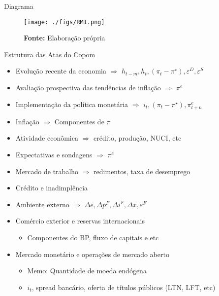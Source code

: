 \documentclass[presentation]{beamer}
\begin{document}
\begin{frame}[label={sec:org46351e0}]{Diagrama}
\begin{figure}[htb]
\centering
\caption{Representação do Modelo do regime de Metas para inflação} 
\texttt{[image: ./figs/RMI.png]}
\label{fig:ibcbr}
\caption*{\textbf{Fonte:} Elaboração própria}
\end{figure}
\end{frame}
\begin{frame}[label={sec:orgd37f975}]{Estrutura das Atas do Copom}
\begin{itemize}
\item Evolução recente da economia \(\Rightarrow\) \(h_{t-m}, h_{t}, (\pi_{t} - \pi^{\star}), \varepsilon^{D}, \varepsilon^{S}\)
\item Avaliação prospectiva das tendências de inflação \(\Rightarrow\) \(\pi^{e}\)
\item Implementação da política monetária \(\Rightarrow\) \(i_{t}, (\pi_{t} - \pi^{\star}), \pi^{e}_{t+n}\)
\item Inflação \(\Rightarrow\) Componentes de \(\pi\)
\item Atividade econômica \(\Rightarrow\) crédito, produção, NUCI, etc
\item Expectativas e sondagens \(\Rightarrow\) \(\pi^{e}\)
\item Mercado de trabalho \(\Rightarrow\) redimentos, taxa de desemprego
\item Crédito e inadimplência
\item Ambiente externo \(\Rightarrow\) \(\Delta e, \Delta p^{F}, \Delta i^{F}, \Delta x, \varepsilon^{F}\)
\item Comércio exterior e reservas internacionais
\begin{itemize}
\item Componentes do BP, fluxo de capitais e etc
\end{itemize}
\item Mercado monetário e operações de mercado aberto
\begin{itemize}
\item \alert{Memo:} Quantidade de moeda endógena
\item \(i_{t}\), spread bancário, oferta de títulos públicos (LTN, LFT, etc)
\end{itemize}
\end{itemize}
\end{frame}
\end{document}
